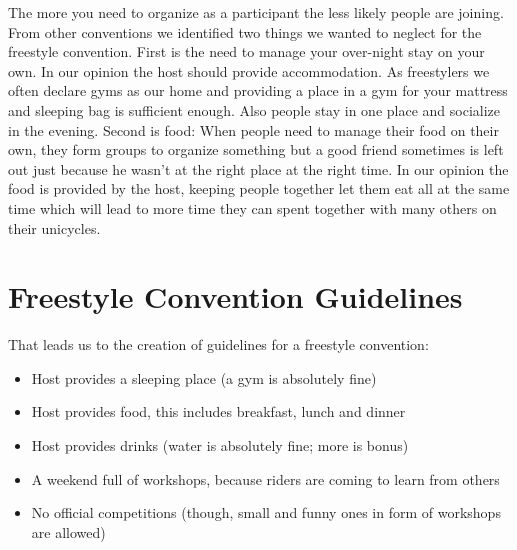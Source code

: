 \documentclass[11pt]{report}
\begin{document}
The more you need to organize as a participant the less likely people are 
joining. From other conventions we identified two things we wanted to neglect 
for the freestyle convention.
First is the need to manage your over-night stay on your own. In our opinion the 
host should provide accommodation. As freestylers we often declare gyms as our 
home and providing a place in a gym for your mattress and sleeping bag is 
sufficient enough. Also people stay in one place and socialize in the evening.
Second is food: When people need to manage their food on their own, they form 
groups to organize something but a good friend sometimes is left out just because 
he wasn't at the right place at the right time. In our opinion the food is 
provided by the host, keeping people together let them eat all at the same time 
which will lead to more time they can spent together with many others on their 
unicycles.

\section{Freestyle Convention Guidelines}

That leads us to the creation of guidelines for a freestyle convention:

\begin{itemize}
	\item Host provides a sleeping place (a gym is absolutely fine)
	\item Host provides food, this includes breakfast, lunch and dinner
	\item Host provides drinks (water is absolutely fine; more is bonus)
	\item A weekend full of workshops, because riders are coming to learn from 
	others
	\item No official competitions (though, small and funny ones in form of workshops are allowed)
\end{itemize}
\end{document}
